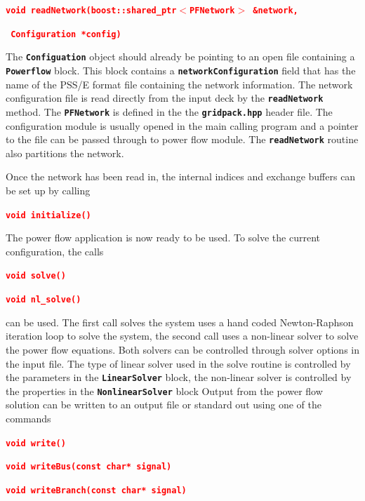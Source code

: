 \documentclass[12pt]{report} %
\begin{document}
\textcolor{red}{\texttt{\textbf{void readNetwork(boost::shared\_ptr$\boldsymbol{\mathrm{<}}$PFNetwork$\boldsymbol{\mathrm{>}}$ \&network,}}}

\textcolor{red}{\texttt{\textbf{      Configuration *config)}}}

The \texttt{\textbf{Configuation}} object should already be pointing to an open file containing a \texttt{\textbf{Powerflow}} block. This block contains a \texttt{\textbf{networkConfiguration}} field that has the name of the PSS/E format file containing the network information. The network configuration file is read directly from the input deck by the \texttt{\textbf{readNetwork }}method. The \texttt{\textbf{PFNetwork}} is defined in the the \texttt{\textbf{gridpack.hpp}} header file. The configuration module is usually opened in the main calling program and a pointer to the file can be passed through to power flow module. The \texttt{\textbf{readNetwork}} routine also partitions the network.

Once the network has been read in, the internal indices and exchange buffers can be set up by calling

\textcolor{red}{\texttt{\textbf{void initialize()}}}

The power flow application is now ready to be used. To solve the current configuration, the calls

\textcolor{red}{\texttt{\textbf{void solve()}}}

\textcolor{red}{\texttt{\textbf{void nl\_solve()}}}

can be used. The first call solves the system uses a hand coded Newton-Raphson iteration loop to solve the system, the second call uses a non-linear solver to solve the power flow equations. Both solvers can be controlled through solver options in the input file. The type of linear solver used in the solve routine is controlled by the parameters in the \texttt{\textbf{LinearSolver}} block, the non-linear solver is controlled by the properties in the \texttt{\textbf{NonlinearSolver}} block
Output from the power flow solution can be written to an output file or standard out using one of the commands

\textcolor{red}{\texttt{\textbf{void write()}}}

\textcolor{red}{\texttt{\textbf{void writeBus(const char* signal)}}}

\textcolor{red}{\texttt{\textbf{void writeBranch(const char* signal)}}}
\end{document}

